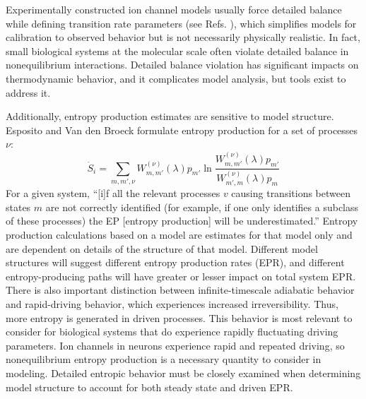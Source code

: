 \documentclass[%
 aip,
 amsmath,amssymb,
 reprint,%
]{revtex4-1}
\begin{document}
Experimentally constructed ion channel models usually force detailed balance while defining transition rate parameters (see Refs. ), which simplifies models for calibration to observed behavior but is not necessarily physically realistic. In fact, small biological systems at the molecular scale often violate detailed balance in nonequilibrium interactions.\cite{REIC2017} Detailed balance violation has significant impacts on thermodynamic behavior, and it complicates model analysis, but tools exist to address it.

Additionally, entropy production estimates are sensitive to model structure. Esposito and Van den Broeck formulate entropy production for a set of processes $\nu$:
\begin{equation}
    \dot{S}_i=\sum_{m,m',\nu}{W^{(\nu)}_{m,m'}(\lambda) p_{m'}\ln \frac{W^{(\nu)}_{m,m'}(\lambda) p_{m'}}{W^{(\nu)}_{m',m}(\lambda) p_{m}}}
    \label{eq:epr}
\end{equation}
For a given system, ``[i]f all the relevant processes $v$ causing transitions between states $m$ are not correctly identified (for example, if one only identifies a subclass of these processes) the EP [entropy production] will be underestimated.''\cite{ESPO2010} Entropy production calculations based on a model are estimates for that model only and are dependent on details of the structure of that model. Different model structures will suggest different entropy production rates (EPR), and different entropy-producing paths will have greater or lesser impact on total system EPR. There is also important distinction between infinite-timescale adiabatic behavior and rapid-driving behavior, which experiences increased irreversibility. Thus, more entropy is generated in driven processes. This behavior is most relevant to consider for biological systems that do experience rapidly fluctuating driving parameters. Ion channels in neurons experience rapid and repeated driving, so nonequilibrium entropy production is a necessary quantity to consider in modeling. Detailed entropic behavior must be closely examined when determining model structure to account for both steady state and driven EPR. 

\end{document}

